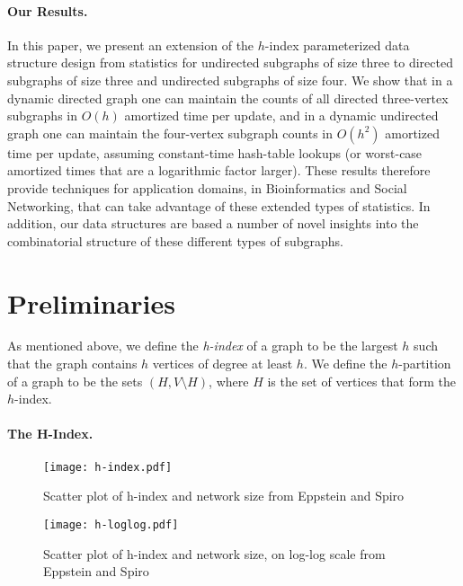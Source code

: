 \documentclass[11pt]{article}
\renewcommand{\subsection}[1]{\paragraph{\textbf{#1}.}}
\begin{document}
\subsection{Our Results}
In this paper,
we present an extension of the $h$-index parameterized data structure
design from statistics for undirected subgraphs of size three to
directed subgraphs of size three and undirected subgraphs of size
four.
We show that in a dynamic directed graph one can maintain the
counts of all directed three-vertex subgraphs in $O(h)$ 
amortized time per update, and in a dynamic undirected graph one
can maintain the four-vertex subgraph counts in $O(h^2)$ 
amortized time per update, assuming constant-time hash-table lookups
(or worst-case amortized times that are a logarithmic factor larger).
These results therefore provide techniques for application domains,
in Bioinformatics and Social Networking,
that can take advantage of these extended types of statistics.
In addition, our data structures are based a number of novel insights
into the combinatorial structure
of these different types of subgraphs.

\section{Preliminaries}
As mentioned above, we define the \emph{h-index}
of a graph to be the largest $h$ such that the graph contains $h$ vertices
of degree at least $h$. We define the $h$-partition of a graph to be
the sets $(H, V \setminus H)$, where $H$ is the set of vertices that 
form the $h$-index.

\subsection{The H-Index}


\begin{figure}[hb!]
\vspace{-24pt}
\begin{center}
\texttt{[image: h-index.pdf]}
\end{center}
\vspace{-24pt}
\caption{Scatter plot of h-index and network size from Eppstein and Spiro~\cite{es-hgadssarx-09}}
\label{fig-h-index}
\vspace{-18pt}
\end{figure}

\begin{figure}[hb!]
\vspace{-24pt}
\begin{center}
\texttt{[image: h-loglog.pdf]}
\end{center}
\vspace{-24pt}
\caption{Scatter plot of h-index and network size, on log-log scale from Eppstein and Spiro~\cite{es-hgadssarx-09}}
\label{fig-h-loglog}
\vspace{-18pt}
\end{figure}
\end{document}
